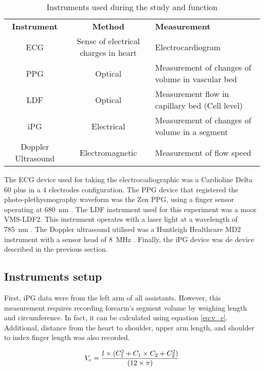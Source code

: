 \begin{table}
	\caption{Instruments used during the study and function}
	\centering
	\label{table:instruments}
	\begin{tabu}{ccp{4.5cm}}
		\hline 
		\textbf{Instrument} & \textbf{Method} & \textbf{Measurement} \\\tabucline[2pt]{-}
		ECG & Sense of electrical charges in heart & Electrocardiogram \\\hline 
		PPG & Optical & Measurement of changes of volume in vascular bed \\\hline 
		LDF & Optical & Measurement flow in capillary bed (Cell level) \\\hline 
		iPG & Electrical & Measurement of changes of volume in a segment \\\hline
		Doppler Ultrasound & Electromagnetic & Measurement of flow speed \\\hline 
	\end{tabu}  
\end{table}

The ECG device used for taking the electrocadiographic was a Cardioline\textsuperscript{\textregistered} Delta 60 plus \cite{remco:delta60} in a 4 electrodes configuration. The PPG device that registered the photo-plethysmography waveform was the Zen PPG, using a finger sensor operating at \SI{680}{\nano\meter} .  The LDF instrument used for this experiment was a moor VMS-LDF2. This instrument operates with a laser light at a wavelength of \SI{785}{\nano\meter} \cite{moor:LDF2}. The Doppler ultrasound utilised was a Huntleigh Healthcare MD2 instrument with a sensor head of \SI{8}{\mega\hertz} \cite{ht:MD2}. Finally, the iPG device was de device described in the previous section. 

\subsection{Instruments setup}
\label{section procedure 1.1}

First, iPG data were from the left arm of all assistants. However, this measurement requires recording forearm's segment volume by weighing length and circumference. In fact, it can be calculated using equation \ref{eq:v_e}. Additional, distance from the heart to shoulder, upper arm length, and shoulder to index finger length was also recorded. 

\begin{align}
	\label{eq:v_e}
	V_e =\frac{l \times (C_1^2+C_1 \times C_2 + C_2^2)}{(12 \times \pi)} \tagaddtext{[\si{\cubic\centi\meter}]}
\end{align}

